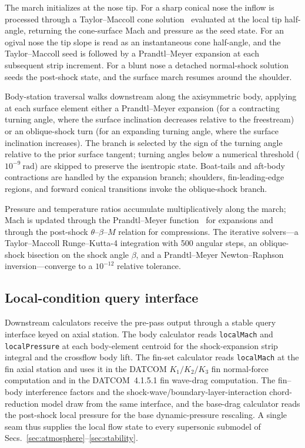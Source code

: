 The march initializes at the nose tip. For a sharp conical nose the inflow is
processed through a Taylor--Maccoll cone solution~\cite{taylormaccoll1933}
evaluated at the local tip half-angle, returning the cone-surface Mach and
pressure as the seed state. For an ogival nose the tip slope is read as an
instantaneous cone half-angle, and the Taylor--Maccoll seed is followed by a
Prandtl--Meyer expansion at each subsequent strip increment. For a blunt nose a
detached normal-shock solution seeds the post-shock state, and the surface march
resumes around the shoulder.

Body-station traversal walks downstream along the axisymmetric body, applying at
each surface element either a Prandtl--Meyer expansion (for a contracting turning
angle, where the surface inclination decreases relative to the freestream) or an
oblique-shock turn (for an expanding turning angle, where the surface inclination
increases). The branch is selected by the sign of the turning angle relative to
the prior surface tangent; turning angles below a numerical threshold
($10^{-9}~\mathrm{rad}$) are skipped to preserve the isentropic state.
Boat-tails and aft-body contractions are handled by the expansion branch;
shoulders, fin-leading-edge regions, and forward conical transitions invoke the
oblique-shock branch.

Pressure and temperature ratios accumulate multiplicatively along the march;
Mach is updated through the Prandtl--Meyer function~\cite{naca1135} for
expansions and through the post-shock $\theta$--$\beta$--$M$ relation for
compressions. The iterative solvers---a Taylor--Maccoll Runge--Kutta-4
integration with 500 angular steps, an oblique-shock bisection on the shock
angle $\beta$, and a Prandtl--Meyer Newton--Raphson inversion---converge to a
$10^{-12}$ relative tolerance.

\subsection{Local-condition query interface}
\label{subsec:prepass-query}

Downstream calculators receive the pre-pass output through a stable query
interface keyed on axial station. The body calculator reads \texttt{localMach}
and \texttt{localPressure} at each body-element centroid for the
shock-expansion strip integral and the crossflow body lift. The fin-set
calculator reads \texttt{localMach} at the fin axial station and uses it in the
DATCOM $K_1/K_2/K_3$ fin normal-force computation and in the DATCOM~4.1.5.1 fin
wave-drag computation. The fin--body interference factors and the
shock-wave/boundary-layer-interaction chord-reduction model draw from the same
interface, and the base-drag calculator reads the post-shock local pressure for
the base dynamic-pressure rescaling. A single seam thus supplies the local flow
state to every supersonic submodel of Secs.~\ref{sec:atmosphere}--\ref{sec:stability}.


